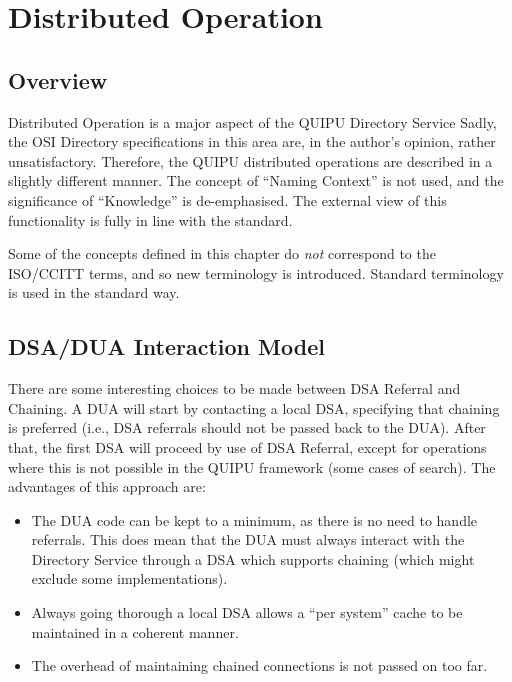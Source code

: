 
\chapter {Distributed Operation}
\label {dist-op}

\section {Overview}


Distributed Operation is a major aspect of the QUIPU
Directory Service
Sadly, the OSI Directory specifications in this area are, in the author's
opinion, rather unsatisfactory.   
Therefore, the QUIPU distributed operations are described in a slightly
different manner.  The concept of ``Naming Context'' is not used, and the
significance of ``Knowledge'' is de-emphasised.  The external view of this
functionality is fully in line with the standard.   

Some of the concepts 
defined in this chapter  do {\em not} correspond to the
ISO/CCITT terms, and so new terminology is introduced. 
Standard terminology is used in the standard way.


\section {DSA/DUA Interaction Model}

There are some interesting choices to be made between DSA Referral and
Chaining.  A DUA will start by contacting a local DSA, specifying that
chaining is preferred (i.e., DSA referrals should not be passed back to the
DUA).  After that, the first DSA will proceed by use of DSA Referral, except
for operations where this is not possible in the QUIPU framework (some cases
of search).  The advantages of this approach are:

\begin {itemize}
\item
The DUA code can be kept to a minimum, as there is no need to handle
referrals.
This does mean that the DUA must always interact with the Directory
Service through a DSA which supports chaining (which might exclude
some implementations).
\item
Always going thorough a local DSA allows a ``per system'' cache to
be maintained in a coherent manner.
\item
The overhead of maintaining chained connections is not passed
on too far.
\end {itemize}

